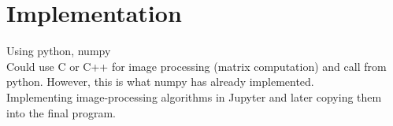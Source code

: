 \section{Implementation}
Using python, numpy\\
Could use C or C++ for image processing (matrix computation) and call from python. However, this is what numpy has already implemented.\\

Implementing image-processing algorithms in Jupyter and later copying them into the final program.